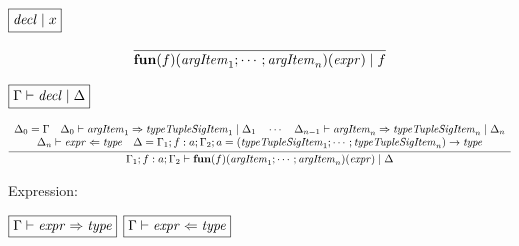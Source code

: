 $\fbox{$\mathit{decl} \mid x$}$

\begin{gather*}
  \infer{\mathbf{fun}(f)(\mathit{argItem}_1; \cdots; \mathit{argItem}_n)(\mathit{expr}) \mid f}{}
\end{gather*}

$\fbox{$\Gamma \vdash \mathit{decl} \mid \Delta$}$

\begin{gather*}
  \infer{\Gamma_1; f: a; \Gamma_2 \vdash \mathbf{fun}(f)(\mathit{argItem}_1; \cdots; \mathit{argItem}_n)(\mathit{expr}) \mid \Delta}{
    \begin{array}{c}
      \Delta_0 = \Gamma
      \hspace{1em}
      \Delta_0 \vdash \mathit{argItem}_1 \Rightarrow \mathit{typeTupleSigItem}_1 \mid \Delta_1
      \hspace{1em}
      \cdots
      \hspace{1em}
      \Delta_{n - 1} \vdash \mathit{argItem}_n \Rightarrow \mathit{typeTupleSigItem}_n \mid \Delta_n
      \\
      \Delta_n \vdash \mathit{expr} \Leftarrow \mathit{type}
      \hspace{1em}
      \Delta = \Gamma_1; f: a; \Gamma_2; a = (\mathit{typeTupleSigItem}_1; \cdots; \mathit{typeTupleSigItem}_n) \rightarrow \mathit{type}
    \end{array}
  }
\end{gather*}

Expression:

$\fbox{$\Gamma \vdash \mathit{expr} \Rightarrow \mathit{type}$}$
$\fbox{$\Gamma \vdash \mathit{expr} \Leftarrow \mathit{type}$}$

